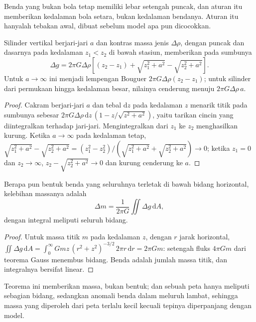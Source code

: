 Benda yang bukan bola tetap memiliki lebar setengah puncak, dan aturan itu
memberikan kedalaman bola setara, bukan kedalaman bendanya. Aturan itu
hanyalah tebakan awal, dibuat sebelum model apa pun dicocokkan.

\begin{proposition}\label{prop:b3:field-lab-methods-3:vcyl}
Silinder vertikal berjari-jari $a$ dan kontras massa jenis $\Delta\rho$,
dengan puncak dan dasarnya pada kedalaman $z_1 < z_2$ di bawah stasiun,
memberikan pada sumbunya
\[
\Delta g = 2\pi G\Delta\rho\left[(z_2 - z_1) + \sqrt{z_1^2 + a^2}
           - \sqrt{z_2^2 + a^2}\right] .
\]
Untuk $a \to \infty$ ini menjadi lempengan Bouguer $2\pi G\Delta\rho(z_2 - z_1)$;
untuk silinder dari permukaan hingga kedalaman besar, nilainya cenderung
menuju $2\pi G\Delta\rho\,a$.
\end{proposition}

\begin{proof}
Cakram berjari-jari $a$ dan tebal $\mathrm{d}z$ pada kedalaman $z$ menarik
titik pada sumbunya sebesar $2\pi G\Delta\rho\,\mathrm{d}z\,(1 -
z/\sqrt{z^2 + a^2})$, yaitu tarikan cincin yang diintegralkan terhadap
jari-jari. Mengintegralkan dari $z_1$ ke $z_2$ menghasilkan kurung. Ketika $a \to
\infty$ pada kedalaman tetap, $\sqrt{z_1^2 + a^2} - \sqrt{z_2^2 + a^2} =
(z_1^2 - z_2^2)/(\sqrt{z_1^2 + a^2} + \sqrt{z_2^2 + a^2}) \to 0$; ketika
$z_1 = 0$ dan $z_2 \to \infty$, $z_2 - \sqrt{z_2^2 + a^2} \to 0$ dan
kurung cenderung ke $a$.
\end{proof}

\begin{proposition}\label{prop:b3:field-lab-methods-3:gauss}
Berapa pun bentuk benda yang seluruhnya terletak di bawah bidang
horizontal, kelebihan massanya adalah
\[
\Delta m = \frac{1}{2\pi G}\iint \Delta g\,\mathrm{d}A ,
\]
dengan integral meliputi seluruh bidang.
\end{proposition}

\begin{proof}
Untuk massa titik $m$ pada kedalaman $z$, dengan $r$ jarak horizontal,
$\iint \Delta g\,\mathrm{d}A = \int_0^\infty
Gmz\,(r^2 + z^2)^{-3/2}\,2\pi r\,\mathrm{d}r = 2\pi Gm$: setengah fluks
$4\pi Gm$ dari teorema Gauss menembus bidang. Benda adalah jumlah massa titik,
dan integralnya bersifat linear.
\end{proof}

Teorema ini memberikan massa, bukan bentuk; dan sebuah peta hanya meliputi sebagian
bidang, sedangkan anomali benda dalam meluruh lambat, sehingga
massa yang diperoleh dari peta terlalu kecil kecuali tepinya diperpanjang dengan
model.

